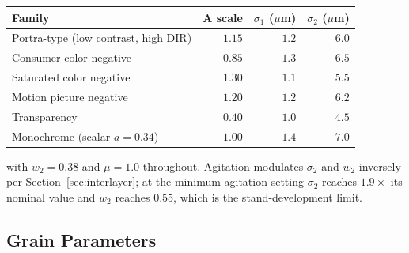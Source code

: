 \begin{center}
\renewcommand{\arraystretch}{1.1}
\footnotesize
\begin{tabular}{@{}lrrr@{}}
\toprule
\textbf{Family} & \textbf{$\mathbf{A}$ scale} & $\sigma_1$ ($\mu$m) & $\sigma_2$ ($\mu$m) \\
\midrule
Portra-type (low contrast, high DIR) & $1.15$ & $1.2$ & $6.0$ \\
Consumer color negative              & $0.85$ & $1.3$ & $6.5$ \\
Saturated color negative             & $1.30$ & $1.1$ & $5.5$ \\
Motion picture negative              & $1.20$ & $1.2$ & $6.2$ \\
Transparency                         & $0.40$ & $1.0$ & $4.5$ \\
Monochrome (scalar $a = 0.34$)       & $1.00$ & $1.4$ & $7.0$ \\
\bottomrule
\end{tabular}
\end{center}

\noindent with $w_2 = 0.38$ and $\mu = 1.0$ throughout. Agitation modulates
$\sigma_2$ and $w_2$ inversely per Section~\ref{sec:interlayer}; at the minimum
agitation setting $\sigma_2$ reaches $1.9\times$ its nominal value and $w_2$
reaches $0.55$, which is the stand-development limit.

\subsection{Grain Parameters}

